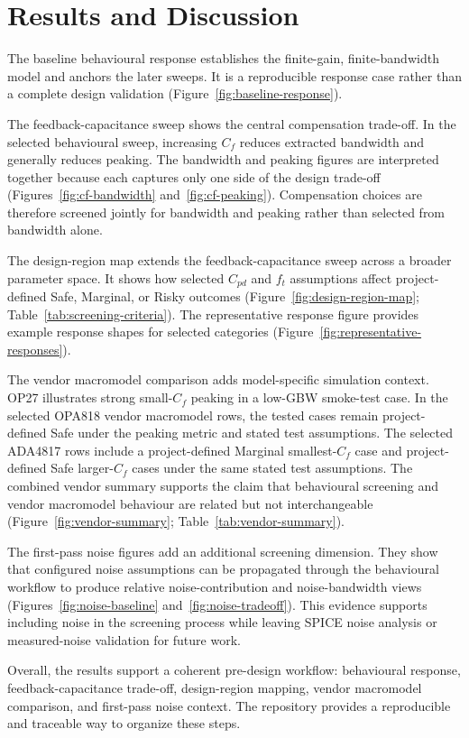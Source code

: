 \section{Results and Discussion}

The baseline behavioural response establishes the finite-gain, finite-bandwidth model and anchors the later sweeps. It is a reproducible response case rather than a complete design validation (Figure~\ref{fig:baseline-response}).

The feedback-capacitance sweep shows the central compensation trade-off. In the selected behavioural sweep, increasing $C_f$ reduces extracted bandwidth and generally reduces peaking. The bandwidth and peaking figures are interpreted together because each captures only one side of the design trade-off (Figures~\ref{fig:cf-bandwidth} and~\ref{fig:cf-peaking}). Compensation choices are therefore screened jointly for bandwidth and peaking rather than selected from bandwidth alone.

The design-region map extends the feedback-capacitance sweep across a broader parameter space. It shows how selected $C_{pd}$ and $f_t$ assumptions affect project-defined Safe, Marginal, or Risky outcomes (Figure~\ref{fig:design-region-map}; Table~\ref{tab:screening-criteria}). The representative response figure provides example response shapes for selected categories (Figure~\ref{fig:representative-responses}).

The vendor macromodel comparison adds model-specific simulation context. OP27 illustrates strong small-$C_f$ peaking in a low-GBW smoke-test case. In the selected OPA818 vendor macromodel rows, the tested cases remain project-defined Safe under the peaking metric and stated test assumptions. The selected ADA4817 rows include a project-defined Marginal smallest-$C_f$ case and project-defined Safe larger-$C_f$ cases under the same stated test assumptions. The combined vendor summary supports the claim that behavioural screening and vendor macromodel behaviour are related but not interchangeable (Figure~\ref{fig:vendor-summary}; Table~\ref{tab:vendor-summary}).

The first-pass noise figures add an additional screening dimension. They show that configured noise assumptions can be propagated through the behavioural workflow to produce relative noise-contribution and noise-bandwidth views (Figures~\ref{fig:noise-baseline} and~\ref{fig:noise-tradeoff}). This evidence supports including noise in the screening process while leaving SPICE noise analysis or measured-noise validation for future work.

Overall, the results support a coherent pre-design workflow: behavioural response, feedback-capacitance trade-off, design-region mapping, vendor macromodel comparison, and first-pass noise context. The repository provides a reproducible and traceable way to organize these steps.
